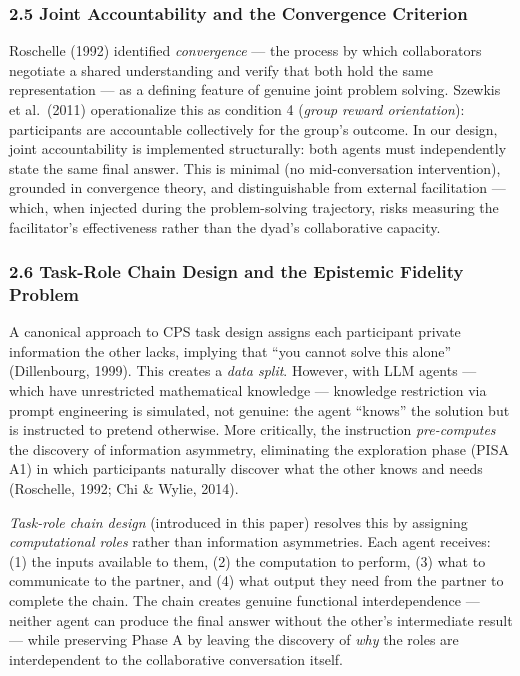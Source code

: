 \documentclass[
  11pt,
]{article}
\begin{document}
\subsubsection{2.5 Joint Accountability and the Convergence
Criterion}\label{joint-accountability-and-the-convergence-criterion}

Roschelle (1992) identified \emph{convergence} --- the process by which
collaborators negotiate a shared understanding and verify that both hold
the same representation --- as a defining feature of genuine joint
problem solving. Szewkis et al.~(2011) operationalize this as condition
4 (\emph{group reward orientation}): participants are accountable
collectively for the group's outcome. In our design, joint
accountability is implemented structurally: both agents must
independently state the same final answer. This is minimal (no
mid-conversation intervention), grounded in convergence theory, and
distinguishable from external facilitation --- which, when injected
during the problem-solving trajectory, risks measuring the facilitator's
effectiveness rather than the dyad's collaborative capacity.

\subsubsection{2.6 Task-Role Chain Design and the Epistemic Fidelity
Problem}\label{task-role-chain-design-and-the-epistemic-fidelity-problem}

A canonical approach to CPS task design assigns each participant private
information the other lacks, implying that ``you cannot solve this
alone'' (Dillenbourg, 1999). This creates a \emph{data split}. However,
with LLM agents --- which have unrestricted mathematical knowledge ---
knowledge restriction via prompt engineering is simulated, not genuine:
the agent ``knows'' the solution but is instructed to pretend otherwise.
More critically, the instruction \emph{pre-computes} the discovery of
information asymmetry, eliminating the exploration phase (PISA A1) in
which participants naturally discover what the other knows and needs
(Roschelle, 1992; Chi \& Wylie, 2014).

\emph{Task-role chain design} (introduced in this paper) resolves this
by assigning \emph{computational roles} rather than information
asymmetries. Each agent receives: (1) the inputs available to them, (2)
the computation to perform, (3) what to communicate to the partner, and
(4) what output they need from the partner to complete the chain. The
chain creates genuine functional interdependence --- neither agent can
produce the final answer without the other's intermediate result ---
while preserving Phase A by leaving the discovery of \emph{why} the
roles are interdependent to the collaborative conversation itself.
\end{document}
